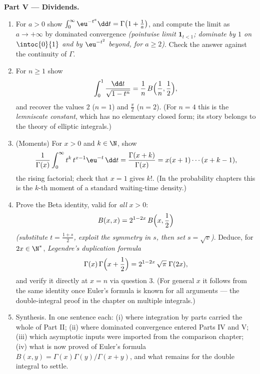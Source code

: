 \begin{problem}
\medskip
\noindent\textbf{Part V --- Dividends.}
\begin{enumerate}[resume]
  \item For $a > 0$ show $\int_0^\infty \eu^{-t^a}\dd t =
        \Gamma\bigl(1 + \frac1a\bigr)$, and compute the limit as
        $a \to +\infty$ by dominated convergence \emph{(pointwise
        limit $\mathbf 1_{t < 1}$; dominate by $1$ on
        $\intoc{0}{1}$ and by $\eu^{-t^2}$ beyond, for $a \geq
        2$)}. Check the answer against the continuity of
        $\Gamma$.
  \item For $n \geq 1$ show
        \[
        \int_0^1 \frac{\dd t}{\sqrt{1 - t^n}}
        = \frac1n\,B\Bigl(\frac1n, \frac12\Bigr),
        \]
        and recover the values $2$ ($n = 1$) and $\frac\pi2$ ($n
        = 2$). (For $n = 4$ this is the \emph{lemniscate
        constant}, which has no elementary closed form; its
        story belongs to the theory of elliptic integrals.)
  \item (Moments) For $x > 0$ and $k \in \N$, show
        \[
        \frac{1}{\Gamma(x)}\int_0^\infty
        t^{k}\,t^{x-1}\eu^{-t}\,\dd t
        = \frac{\Gamma(x+k)}{\Gamma(x)}
        = x(x+1)\cdots(x+k-1),
        \]
        the rising factorial; check that $x = 1$ gives $k!$. (In
        the probability chapters this is the $k$-th moment of a
        standard waiting-time density.)
  \item Prove the Beta identity, valid for \emph{all} $x > 0$:
        \[
        B(x, x) = 2^{1-2x}\,B\Bigl(x, \frac12\Bigr)
        \]
        \emph{(substitute $t = \frac{1+s}2$, exploit the
        symmetry in $s$, then set $s = \sqrt v$)}. Deduce, for
        $2x \in \N^*$, \emph{Legendre's duplication formula}
        \[
        \Gamma(x)\,\Gamma\Bigl(x + \frac12\Bigr)
        = 2^{1-2x}\,\sqrt\pi\;\Gamma(2x),
        \]
        and verify it directly at $x = n$ via question 3. (For
        general $x$ it follows from the same identity once
        Euler's formula is known for all arguments --- the
        double-integral proof in the chapter on multiple
        integrals.)
  \item Synthesis. In one sentence each: (i) where integration
        by parts carried the whole of Part II; (ii) where
        dominated convergence entered Parts IV and V; (iii) which
        asymptotic inputs were imported from the comparison
        chapter; (iv) what is now proved of Euler's formula
        $B(x,y) = \Gamma(x)\Gamma(y)/\Gamma(x+y)$, and what
        remains for the double integral to settle.
\end{enumerate}
\end{problem}
